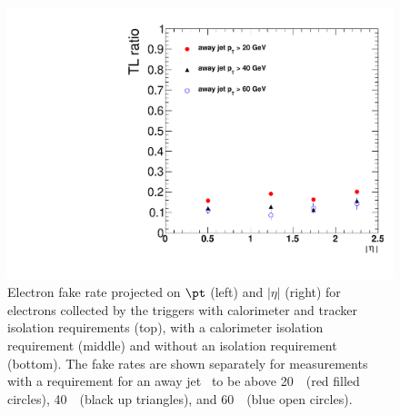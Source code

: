 \begin{figure}[h]
\begin{center}
\includegraphics[width=0.48\linewidth]{figs/eleFRnoIso_data_etaProj}
\caption{\label{fig:frelectron}Electron fake rate projected on $\pt$ (left) and $|\eta|$ (right)
for electrons collected by the triggers with calorimeter and tracker isolation requirements (top), with a calorimeter isolation requirement (middle) and without an isolation requirement (bottom).
The fake rates are shown separately for measurements  with a requirement for an away jet \pt\ 
to be above 20~\GeV\ (red filled circles), 40~\GeV\ (black up triangles), and 60~\GeV\ (blue open circles).
}
\end{center}
\end{figure}

\clearpage

